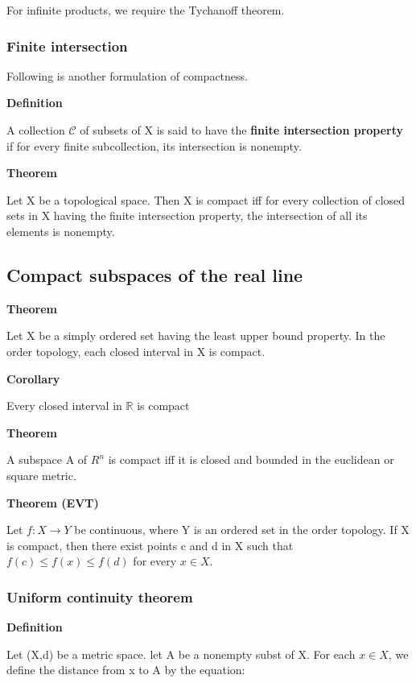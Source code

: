 \documentclass[11pt]{article}
\begin{document}
For infinite products, we require the Tychanoff theorem.


\subsubsection{Finite intersection}
\label{sec:org835b3c7}

Following is another formulation of compactness.

\textbf{Definition}

A collection \(\mathcal{C}\) of subsets of X is said to have the \textbf{finite intersection property} if for every finite subcollection, its intersection is nonempty.

\textbf{Theorem}

Let X be a topological space. Then X is compact iff for every collection of closed sets in X having the finite intersection property, the intersection of all its elements is nonempty.

\subsection{Compact subspaces of the real line}
\label{sec:org461f6ce}

\textbf{Theorem}


Let X be a simply ordered set having the least upper bound property. In the order topology, each closed interval in X is compact.

\textbf{Corollary}

Every closed interval in \(\mathbb{R}\) is compact

\textbf{Theorem}

A subspace A of \(R^n\) is compact iff it is closed and bounded in the euclidean or square metric.


\textbf{Theorem (EVT)}

Let \(f : X \to Y\) be continuous, where Y is an ordered set in the order topology. If X is compact, then there exist points c and d in X such that \(f(c) \leq f(x) \leq f(d)\) for every \(x \in X\).

\subsubsection{Uniform continuity theorem}
\label{sec:org0bd582b}

\textbf{Definition}

Let (X,d) be a metric space. let A be a nonempty subst of X. For each \(x \in X\), we define the distance from x to A by the equation:
\end{document}
